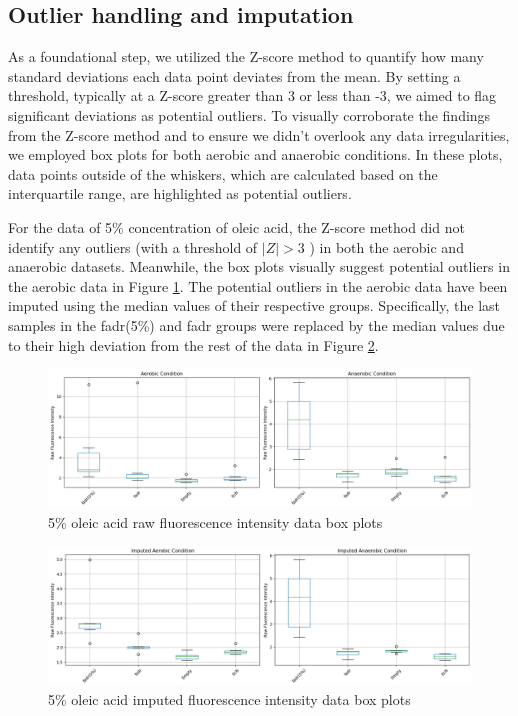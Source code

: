 \documentclass[UTF8]{article}
\begin{document}
\subsection{Outlier handling and imputation}

As a foundational step, we utilized the Z-score method to quantify how many standard deviations each data point deviates from the mean. By setting a threshold, typically at a Z-score greater than 3 or less than -3, we aimed to flag significant deviations as potential outliers. To visually corroborate the findings from the Z-score method and to ensure we didn't overlook any data irregularities, we employed box plots for both aerobic and anaerobic conditions. In these plots, data points outside of the whiskers, which are calculated based on the interquartile range, are highlighted as potential outliers. 

For the data of 5\% concentration of oleic acid,
the Z-score method did not identify any outliers (with a threshold of $|Z|>3$ ) in both the aerobic and anaerobic datasets. Meanwhile, the box plots visually suggest potential outliers in the aerobic data in Figure \ref{fig:5 oleic acid raw data box plots}. The potential outliers in the aerobic data have been imputed using the median values of their respective groups. Specifically, the last samples in the fadr(5\%) and fadr groups were replaced by the median values due to their high deviation from the rest of the data in Figure \ref{fig:5 oleic acid imputed data box plots}.

\begin{figure}[h]
	\centering
	\includegraphics[width=0.8\linewidth]{figures/rawCondition5.png}
	\caption{5\% oleic acid raw fluorescence intensity data box plots}
	\label{fig:5 oleic acid raw data box plots}
\end{figure}

\begin{figure}[h]
	\centering
	\includegraphics[width=0.8\linewidth]{figures/imputedCondition5.png}
	\caption{5\% oleic acid imputed fluorescence intensity data box plots}
	\label{fig:5 oleic acid imputed data box plots}
\end{figure}
\end{document}
